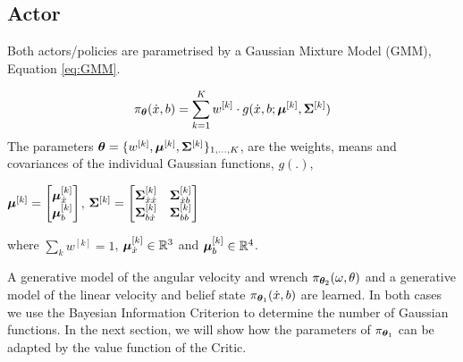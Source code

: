 \subsection{Actor}
Both actors/policies are parametrised by a Gaussian Mixture Model (GMM), Equation \ref{eq:GMM}.

\begin{equation}
 \pi_{\boldsymbol{\theta}}(\dot{x},b) = \sum\limits_{k=1}^{K} w^{[k]}	    \cdot  g(\dot{x},b;\boldsymbol{\mu}^{[k]},\boldsymbol{\Sigma}^{[k]}) \label{eq:GMM}
\end{equation}
The parameters $\boldsymbol{\theta} = \{w^{[k]},\boldsymbol{\mu}^{[k]},\boldsymbol{\Sigma}^{[k]}\}_{1,\dots,K}$, are the weights, means and covariances 
of the individual Gaussian functions, $g(.)$,
\begin{center}
$\boldsymbol{\mu}^{[k]} =  \begin{bmatrix} \boldsymbol{\mu}^{[k]}_{\dot{x}} \\ \boldsymbol{\mu}^{[k]}_{b} \end{bmatrix}$, 
$\boldsymbol{\Sigma}^{[k]} =  \begin{bmatrix} 
	  \boldsymbol{\Sigma}^{[k]}_{\dot{x}\dot{x}} & \boldsymbol{\Sigma}^{[k]}_{\dot{x}b} \\
	  \boldsymbol{\Sigma}^{[k]}_{b\dot{x}} & \boldsymbol{\Sigma}^{[k]}_{bb}
	  \end{bmatrix}$
\end{center}
where $\sum_{k} w^{[k]} = 1$, $\boldsymbol{\mu}^{[k]}_{\dot{x}} \in \mathbb{R}^{3}$ and  $\boldsymbol{\mu}^{[k]}_{b} \in \mathbb{R}^{4}$.

A generative model of the angular velocity and wrench $\pi_{\boldsymbol{\theta}_2}(\omega,\theta)$ and a generative model 
of the linear velocity and belief state $\pi_{\boldsymbol{\theta}_1}(\dot{x},b)$ are learned. 
In both cases we use the Bayesian Information Criterion to determine the number of Gaussian functions.
In the next section, we will show how the parameters of $\pi_{\boldsymbol{\theta}_1}$ can be adapted by the value function of the Critic.


